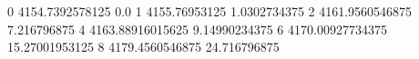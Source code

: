 0 4154.7392578125 0.0
1 4155.76953125 1.0302734375
2 4161.9560546875 7.216796875
4 4163.88916015625 9.14990234375
6 4170.00927734375 15.27001953125
8 4179.4560546875 24.716796875
